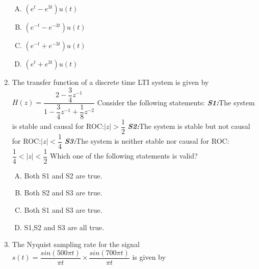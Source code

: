 \documentclass[journal,12pt,twocolumn]{IEEEtran}
\begin{document}
\begin{enumerate}
\begin{enumerate}[(A)]
\setlength\itemsep{2em}

\item $(e^{t}-e^{3t})u(t)$
\item $(e^{-t}-e^{-3t})u(t)$
\item $(e^{-t}+e^{-3t})u(t)$
\item $(e^{t}+e^{3t})u(t)$

\end{enumerate}

\item The transfer function of a discrete time LTI system is given by $H(z)=\dfrac{2-\dfrac{3}{4}z^{-1}}{1-\dfrac{3}{4}z^{-1}+\dfrac{1}{8}z^{-2}}$ \newline Consider the following statements:
\newline \textbf{\textit{S1:}}The system is stable and causal for ROC:$|z|>\dfrac{1}{2}$
\newline \textbf{\textit{S2:}}The system is stable but not causal for ROC:$|z|<\dfrac{1}{4}$
\newline \textbf{\textit{S3:}}The system is neither stable nor  causal for ROC:$\dfrac{1}{4}<|z|<\dfrac{1}{2}$
\newline Which one of the following statements is valid?
\begin{enumerate}[(A)]

\setlength\itemsep{2em}

\item Both S1 and S2 are true.
\item Both S2 and S3 are true.
\item Both S1 and S3 are true.
\item S1,S2 and S3 are all true.

\end{enumerate}

\item The Nyquist sampling rate for the signal $s(t)=\dfrac{sin(500\pi t)}{\pi t}\times \dfrac{sin(700\pi t)}{\pi t}$ is given by 

\begin{enumerate}[(A)]
\end{enumerate}


\end{enumerate}
\end{document}

